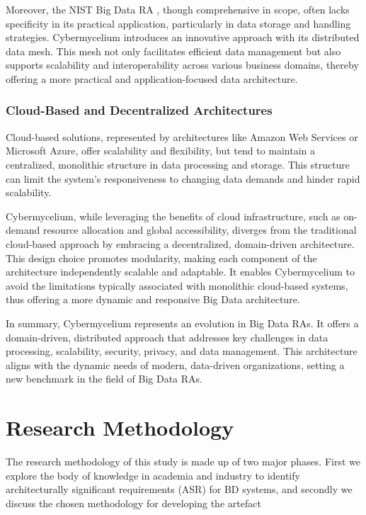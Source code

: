 \documentclass[review]{elsarticle}
\begin{document}
Moreover, the NIST Big Data RA \cite{Chang}, though comprehensive in scope, often lacks specificity in its practical application, particularly in data storage and handling strategies. Cybermycelium introduces an innovative approach with its distributed data mesh. This mesh not only facilitates efficient data management but also supports scalability and interoperability across various business domains, thereby offering a more practical and application-focused data architecture.

\subsubsection{Cloud-Based and Decentralized Architectures}
Cloud-based solutions, represented by architectures like Amazon Web Services or Microsoft Azure, offer scalability and flexibility, but tend to maintain a centralized, monolithic structure in data processing and storage. This structure can limit the system's responsiveness to changing data demands and hinder rapid scalability. 

Cybermycelium, while leveraging the benefits of cloud infrastructure, such as on-demand resource allocation and global accessibility, diverges from the traditional cloud-based approach by embracing a decentralized, domain-driven architecture. This design choice promotes modularity, making each component of the architecture independently scalable and adaptable. It enables Cybermycelium to avoid the limitations typically associated with monolithic cloud-based systems, thus offering a more dynamic and responsive Big Data architecture.


In summary, Cybermycelium represents an evolution in Big Data RAs. It offers a domain-driven, distributed approach that addresses key challenges in data processing, scalability, security, privacy, and data management. This architecture aligns with the dynamic needs of modern, data-driven organizations, setting a new benchmark in the field of Big Data RAs.




 
\section{Research Methodology} \label{RM-section}

The research methodology of this study is made up of two major phases. First we explore the body of knowledge in academia and industry to identify architecturally significant requirements (ASR) for BD systems, and secondly we discuss the chosen methodology for developing the artefact
\end{document}
